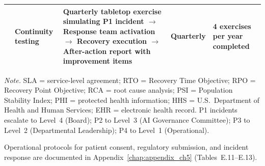 \begin{table}[!htbp]
\begin{tabularx}{\textwidth}{@{} p{0.4cm} p{1.8cm} L p{1.8cm} p{1.8cm} @{}}
 & Continuity testing & Quarterly tabletop exercise simulating P1 incident $\to$ Response team activation $\to$ Recovery execution $\to$ After-action report with improvement items & Quarterly & 4 exercises per year completed \\
\bottomrule
\end{tabularx}
\vspace{0.5em}\noindent\textit{Note.} SLA = service-level agreement; RTO = Recovery Time Objective; RPO = Recovery Point Objective; RCA = root cause analysis; PSI = Population Stability Index; PHI = protected health information; HHS = U.S.\ Department of Health and Human Services; EHR = electronic health record. P1 incidents escalate to Level~4 (Board); P2 to Level~3 (AI Governance Committee); P3 to Level~2 (Departmental Leadership); P4 to Level~1 (Operational).
\end{table}

Operational protocols for patient consent, regulatory submission, and incident response are documented in Appendix~\ref{chap:appendix_ch5} (Tables~E.11--E.13).

